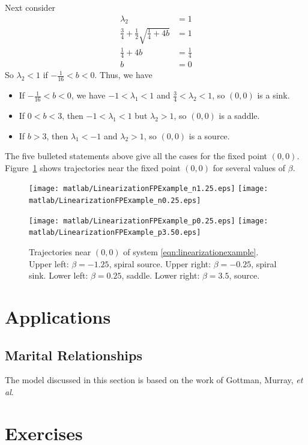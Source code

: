 \documentclass{book}
\begin{document}
Next consider
\begin{equation}
\begin{split}
   \lambda_2 & = 1 \\
   \frac{3}{4} + \frac{1}{2} \sqrt{\frac{1}{4}+4b} & = 1 \\
   \frac{1}{4}+4b & = \frac{1}{4} \\
   b & = 0
\end{split}
\end{equation}
So $\lambda_2 < 1$ if $-\frac{1}{16} < b < 0$.
Thus, we have
\begin{itemize}
\item
If $-\frac{1}{16} < b < 0$, we have $-1 < \lambda_1 < 1$ and $\frac{3}{4} < \lambda_2 < 1$, so
$(0,0)$ is a sink.
\item
If $0 < b < 3$, then $-1 < \lambda_1 < 1$ but $\lambda_2 > 1$, so 
$(0,0)$ is a saddle.
\item
If $b > 3$, then $\lambda_1 < -1$ and $\lambda_2 > 1$, so
$(0,0)$ is a source.
\end{itemize}
The five bulleted statements above give all the cases for the
fixed point $(0,0)$.
Figure~\ref{fig:LinearizationFPExamples} shows trajectories
near the fixed point $(0,0)$ for several values of $\beta$.
\begin{figure}
\centerline{%
\texttt{[image: matlab/LinearizationFPExample\_n1.25.eps]}
\texttt{[image: matlab/LinearizationFPExample\_n0.25.eps]}
}
\centerline{%
\texttt{[image: matlab/LinearizationFPExample\_p0.25.eps]}
\texttt{[image: matlab/LinearizationFPExample\_p3.50.eps]}
}
\caption{Trajectories near $(0,0)$ of system
\eqref{eqn:linearizationexample}. Upper left: $\beta=-1.25$, spiral source.
Upper right: $\beta=-0.25$, spiral sink.
Lower left: $\beta=0.25$, saddle.
Lower right: $\beta=3.5$, source.}
\label{fig:LinearizationFPExamples}
\end{figure}



\section{Applications}
\subsection{Marital Relationships}
The model discussed in this section is based on the
work of Gottman, Murray, \emph{et al}\cite{GM}.
\section{Exercises}
%
%
%
\end{document}

